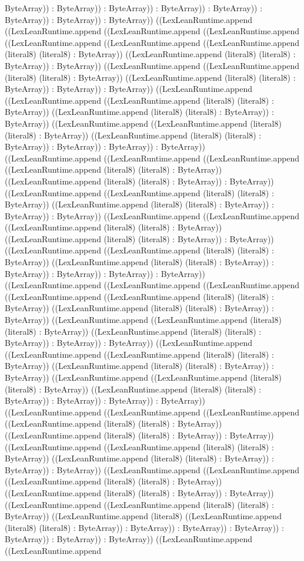 \documentclass[11pt]{article}
\begin{document}
ByteArray)) : ByteArray)) : ByteArray)) : ByteArray)) : ByteArray)) : ByteArray)) : ByteArray)) : ByteArray)) ((LexLeanRuntime.append ((LexLeanRuntime.append ((LexLeanRuntime.append ((LexLeanRuntime.append ((LexLeanRuntime.append ((LexLeanRuntime.append ((LexLeanRuntime.append (literal8) (literal8) : ByteArray)) ((LexLeanRuntime.append (literal8) (literal8) : ByteArray)) : ByteArray)) ((LexLeanRuntime.append ((LexLeanRuntime.append (literal8) (literal8) : ByteArray)) ((LexLeanRuntime.append (literal8) (literal8) : ByteArray)) : ByteArray)) : ByteArray)) ((LexLeanRuntime.append ((LexLeanRuntime.append ((LexLeanRuntime.append (literal8) (literal8) : ByteArray)) ((LexLeanRuntime.append (literal8) (literal8) : ByteArray)) : ByteArray)) ((LexLeanRuntime.append ((LexLeanRuntime.append (literal8) (literal8) : ByteArray)) ((LexLeanRuntime.append (literal8) (literal8) : ByteArray)) : ByteArray)) : ByteArray)) : ByteArray)) ((LexLeanRuntime.append ((LexLeanRuntime.append ((LexLeanRuntime.append ((LexLeanRuntime.append (literal8) (literal8) : ByteArray)) ((LexLeanRuntime.append (literal8) (literal8) : ByteArray)) : ByteArray)) ((LexLeanRuntime.append ((LexLeanRuntime.append (literal8) (literal8) : ByteArray)) ((LexLeanRuntime.append (literal8) (literal8) : ByteArray)) : ByteArray)) : ByteArray)) ((LexLeanRuntime.append ((LexLeanRuntime.append ((LexLeanRuntime.append (literal8) (literal8) : ByteArray)) ((LexLeanRuntime.append (literal8) (literal8) : ByteArray)) : ByteArray)) ((LexLeanRuntime.append ((LexLeanRuntime.append (literal8) (literal8) : ByteArray)) ((LexLeanRuntime.append (literal8) (literal8) : ByteArray)) : ByteArray)) : ByteArray)) : ByteArray)) : ByteArray)) ((LexLeanRuntime.append ((LexLeanRuntime.append ((LexLeanRuntime.append ((LexLeanRuntime.append ((LexLeanRuntime.append (literal8) (literal8) : ByteArray)) ((LexLeanRuntime.append (literal8) (literal8) : ByteArray)) : ByteArray)) ((LexLeanRuntime.append ((LexLeanRuntime.append (literal8) (literal8) : ByteArray)) ((LexLeanRuntime.append (literal8) (literal8) : ByteArray)) : ByteArray)) : ByteArray)) ((LexLeanRuntime.append ((LexLeanRuntime.append ((LexLeanRuntime.append (literal8) (literal8) : ByteArray)) ((LexLeanRuntime.append (literal8) (literal8) : ByteArray)) : ByteArray)) ((LexLeanRuntime.append ((LexLeanRuntime.append (literal8) (literal8) : ByteArray)) ((LexLeanRuntime.append (literal8) (literal8) : ByteArray)) : ByteArray)) : ByteArray)) : ByteArray)) ((LexLeanRuntime.append ((LexLeanRuntime.append ((LexLeanRuntime.append ((LexLeanRuntime.append (literal8) (literal8) : ByteArray)) ((LexLeanRuntime.append (literal8) (literal8) : ByteArray)) : ByteArray)) ((LexLeanRuntime.append ((LexLeanRuntime.append (literal8) (literal8) : ByteArray)) ((LexLeanRuntime.append (literal8) (literal8) : ByteArray)) : ByteArray)) : ByteArray)) ((LexLeanRuntime.append ((LexLeanRuntime.append ((LexLeanRuntime.append (literal8) (literal8) : ByteArray)) ((LexLeanRuntime.append (literal8) (literal8) : ByteArray)) : ByteArray)) ((LexLeanRuntime.append ((LexLeanRuntime.append (literal8) (literal8) : ByteArray)) ((LexLeanRuntime.append (literal8) ((LexLeanRuntime.append (literal8) (literal8) : ByteArray)) : ByteArray)) : ByteArray)) : ByteArray)) : ByteArray)) : ByteArray)) : ByteArray)) ((LexLeanRuntime.append ((LexLeanRuntime.append 
\end{document}
